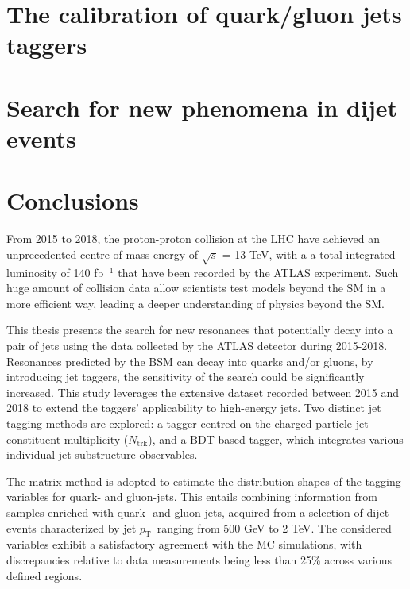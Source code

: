 \documentclass[UTF8,12pt]{ctexart}
\numberwithin{equation}{section}
\newcommand{\ntrk}{\ensuremath{N_{\mathrm{trk}}}\xspace}
\newcommand{\pt}{\ensuremath{p_{\mathrm{T}}\xspace}}
\def\ifb{fb$^{-1}$ }
\begin{document}
\newpage
{}
\section{The calibration of quark/gluon jets taggers}
\label{sec:5}



\newpage
{}
\section{Search for new phenomena in dijet events}
\label{sec:6}



\newpage
{}
\section{Conclusions}
\label{sec:7}

From 2015 to 2018, the proton-proton collision at the LHC have achieved an unprecedented centre-of-mass energy of $\sqrt{s}$ = 13 TeV, with a a total integrated luminosity of 140 \ifb that have been recorded by the ATLAS experiment. Such huge amount of collision data allow scientists test models beyond the SM in a more efficient way, leading a deeper understanding of physics beyond the SM.

This thesis presents the search for new resonances that potentially decay into a pair of jets using the data collected by the ATLAS detector during 2015-2018. Resonances predicted by the BSM can decay into quarks and/or gluons, by introducing jet taggers, the sensitivity of the search could be significantly increased. This study leverages the extensive dataset recorded between 2015 and 2018 to extend the taggers' applicability to high-energy jets. Two distinct jet tagging methods are explored: a tagger centred on the charged-particle jet constituent multiplicity (\ntrk), and a BDT-based tagger, which integrates various individual jet substructure observables. 

The matrix method is adopted to estimate the distribution shapes of the tagging variables for quark- and gluon-jets. This entails combining information from samples enriched with quark- and gluon-jets, acquired from a selection of dijet events characterized by jet \pt~ranging from 500 GeV to 2 TeV. The considered variables exhibit a satisfactory agreement with the MC simulations, with discrepancies relative to data measurements being less than 25\% across various defined regions. 
\end{document}
